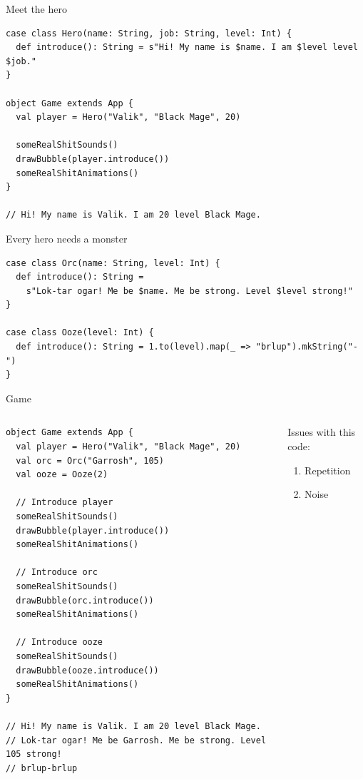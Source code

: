 \documentclass[presentation,aspectratio=169,smaller]{beamer}
\begin{document}
\begin{frame}[label={sec:org095b75e},fragile]{Meet the hero}
 \begin{verbatim}
case class Hero(name: String, job: String, level: Int) {
  def introduce(): String = s"Hi! My name is $name. I am $level level $job."
}

object Game extends App {
  val player = Hero("Valik", "Black Mage", 20)

  someRealShitSounds()
  drawBubble(player.introduce())
  someRealShitAnimations()
}

// Hi! My name is Valik. I am 20 level Black Mage.
\end{verbatim}
\end{frame}

\begin{frame}[label={sec:org755f55e},fragile]{Every hero needs a monster}
 \begin{verbatim}
case class Orc(name: String, level: Int) {
  def introduce(): String =
    s"Lok-tar ogar! Me be $name. Me be strong. Level $level strong!"
}

case class Ooze(level: Int) {
  def introduce(): String = 1.to(level).map(_ => "brlup").mkString("-")
}
\end{verbatim}
\end{frame}

\begin{frame}[label={sec:orged595c3},fragile]{Game}
 \begin{columns}
\begin{column}[t]{0.46\columnwidth}
\begin{verbatim}
object Game extends App {
  val player = Hero("Valik", "Black Mage", 20)
  val orc = Orc("Garrosh", 105)
  val ooze = Ooze(2)

  // Introduce player
  someRealShitSounds()
  drawBubble(player.introduce())
  someRealShitAnimations()

  // Introduce orc
  someRealShitSounds()
  drawBubble(orc.introduce())
  someRealShitAnimations()

  // Introduce ooze
  someRealShitSounds()
  drawBubble(ooze.introduce())
  someRealShitAnimations()
}

// Hi! My name is Valik. I am 20 level Black Mage.
// Lok-tar ogar! Me be Garrosh. Me be strong. Level 105 strong!
// brlup-brlup
\end{verbatim}

\pause
\end{column}

\begin{column}[t]{0.46\columnwidth}
\vspace*{0px}

Issues with this code:

\begin{enumerate}
\item Repetition
\item Noise
\end{enumerate}
\end{column}
\end{columns}
\end{frame}
\end{document}
